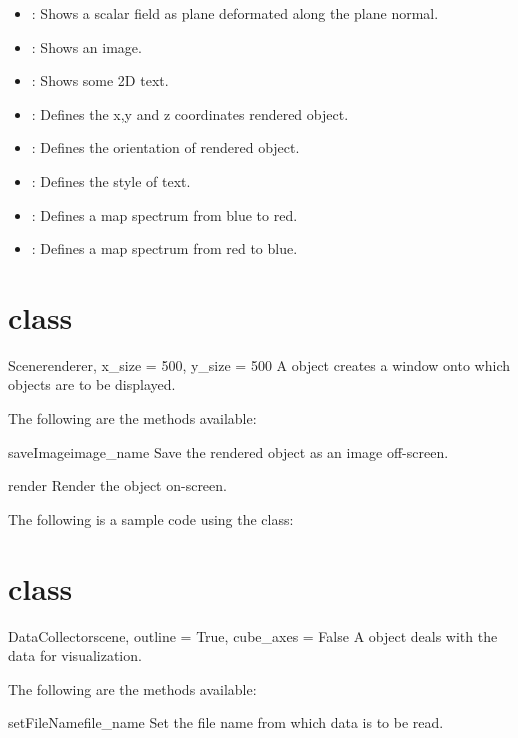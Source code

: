 \begin{itemize}
\item \Carpet: Shows a scalar field as plane deformated along 
the plane normal.
\item \Image: Shows an image.
\item \Text: Shows some 2D text.
\item \Position: Defines the x,y and z coordinates rendered object.
\item \Transform: Defines the orientation of rendered object.
\item \Style: Defines the style of text.
\item \BlueToRed: Defines a map spectrum from blue to red.
\item \RedToBlue: Defines a map spectrum from red to blue.
\end{itemize}

\section{\Scene class}
\begin{classdesc}{Scene}{renderer, x_size = 500, y_size = 500}
A \Scene object creates a window onto which objects are to be displayed. 
\end{classdesc}

The following are the methods available:
\begin{methoddesc}[Scene]{saveImage}{image_name}
Save the rendered object as an image off-screen. 
\end{methoddesc}

\begin{methoddesc}[Scene]{render}{}
Render the object on-screen.
\end{methoddesc}

The following is a sample code using the \Scene class:


\section{\DataCollector class}
\begin{classdesc}{DataCollector}{scene, outline = True, cube_axes = False}
A \DataCollector object deals with the data for visualization.
\end{classdesc}

The following are the methods available:
\begin{methoddesc}[DataCollector]{setFileName}{file_name}
Set the file name from which data is to be read.
\end{methoddesc}

